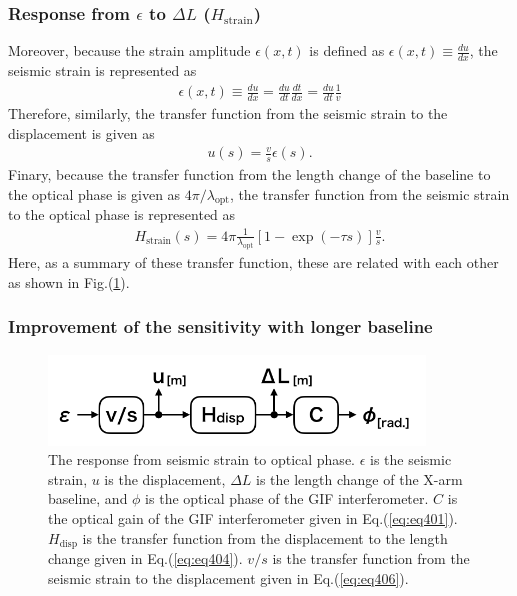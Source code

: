 \subsubsection{Response from $\epsilon$ to $\Delta{L}$ ($H_{\mathrm{strain}}$)}
Moreover, because the strain amplitude $\epsilon{(x,t)}$ is defined as $\epsilon{(x,t)}\equiv\frac{du}{dx}$, the seismic strain is represented as 
\begin{eqnarray} 
  \epsilon{(x,t)} \equiv \frac{du}{dx} = \frac{du}{dt} \frac{dt}{dx} =  \frac{du}{dt} \frac{1}{v} \label{eq:eq406}
\end{eqnarray}
Therefore, similarly, the transfer function from the seismic strain to the displacement is given  as
\begin{eqnarray} \label{eq:eq407}
  u(s) = \frac{v}{s} \epsilon(s).
\end{eqnarray}
Finary, because the transfer function from the length change of the baseline to the optical phase is given as $4\pi/{\lambda_{\mathrm{opt}}}$, the transfer function from the seismic strain to the optical phase is represented as 
\begin{eqnarray} \label{eq:eq407}
  H_{\mathrm{strain}}(s) = 4\pi\frac{1}{\lambda_{\mathrm{opt}}} \left[1 - \exp(-\tau{s}) \right]\frac{v}{s}.
\end{eqnarray}
Here, as a summary of these transfer function, these are related with each other as shown in Fig.(\ref{img:img411}). 

\subsubsection{Improvement of the sensitivity with longer baseline}
\begin{figure}[h]
  \centering
  \includegraphics[width=10.0cm]{./img_chap4/img411.png}
  \caption{The response from seismic strain to optical phase. $\epsilon$ is the seismic strain, $u$ is the displacement, $\Delta{L}$ is the length change of the X-arm baseline, and $\phi$ is the optical phase of the GIF interferometer. $C$ is the optical gain of the GIF interferometer given in Eq.(\ref{eq:eq401}). $H_{\mathrm{disp}}$ is the transfer function from the displacement to the length change given in Eq.(\ref{eq:eq404}). $v/s$ is the transfer function from the seismic strain to the displacement given in Eq.(\ref{eq:eq406}). } \label{img:img411}
\end{figure}


